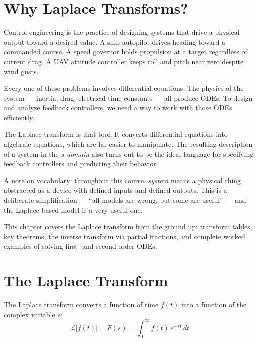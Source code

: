 \documentclass[../../book.tex]{subfiles}
\begin{document}

\section{Why Laplace Transforms?}
\label{sec:intro}

Control engineering is the practice of designing systems that drive a physical
output toward a desired value.  A ship autopilot drives heading toward a
commanded course.  A speed governor holds propulsion at a target regardless of
current drag.  A UAV attitude controller keeps roll and pitch near zero despite
wind gusts.

Every one of these problems involves differential equations.  The physics of the
system --- inertia, drag, electrical time constants --- all produce ODEs.  To
design and analyze feedback controllers, we need a way to work with those ODEs
efficiently.

The Laplace transform is that tool.  It converts differential equations into
algebraic equations, which are far easier to manipulate.  The resulting
description of a system in the \emph{$s$-domain} also turns out to be the ideal
language for specifying feedback controllers and predicting their behavior.

A note on vocabulary: throughout this course, \emph{system} means a physical
thing abstracted as a device with defined inputs and defined outputs.  This is a
deliberate simplification --- ``all models are wrong, but some are useful'' ---
and the Laplace-based model is a very useful one.

This chapter covers the Laplace transform from the ground up: transform tables,
key theorems, the inverse transform via partial fractions, and complete worked
examples of solving first- and second-order ODEs.

\section{The Laplace Transform}
\label{sec:laplace}

The Laplace transform converts a function of time $f(t)$ into a function of
the complex variable $s$:
\begin{equation}
  \mathcal{L}\bigl[f(t)\bigr] = F(s) = \int_0^{\infty} f(t)\, e^{-st}\, dt
  \label{eq:definition}
\end{equation}
\end{document}
